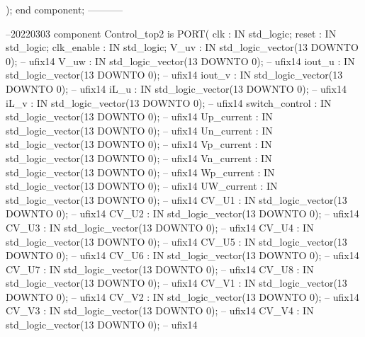 \begin{mylisting}[language=VHDL,caption=トップモジュール,label=appF_Top_module_VHDL]
			);
	end component;
		-----------
		
		
			--20220303
		component Control_top2 is
  PORT( clk                               :   IN    std_logic;
        reset                             :   IN    std_logic;
        clk_enable                        :   IN    std_logic;
        V_uv                              :   IN    std_logic_vector(13 DOWNTO 0);  -- ufix14
        V_uw                              :   IN    std_logic_vector(13 DOWNTO 0);  -- ufix14
        iout_u                            :   IN    std_logic_vector(13 DOWNTO 0);  -- ufix14
        iout_v                            :   IN    std_logic_vector(13 DOWNTO 0);  -- ufix14
        iL_u                              :   IN    std_logic_vector(13 DOWNTO 0);  -- ufix14
        iL_v                              :   IN    std_logic_vector(13 DOWNTO 0);  -- ufix14
        switch_control                    :   IN    std_logic_vector(13 DOWNTO 0);  -- ufix14
        Up_current                        :   IN    std_logic_vector(13 DOWNTO 0);  -- ufix14
        Un_current                        :   IN    std_logic_vector(13 DOWNTO 0);  -- ufix14
        Vp_current                        :   IN    std_logic_vector(13 DOWNTO 0);  -- ufix14
        Vn_current                        :   IN    std_logic_vector(13 DOWNTO 0);  -- ufix14
        Wp_current                        :   IN    std_logic_vector(13 DOWNTO 0);  -- ufix14
        UW_current                        :   IN    std_logic_vector(13 DOWNTO 0);  -- ufix14
        CV_U1                             :   IN    std_logic_vector(13 DOWNTO 0);  -- ufix14
        CV_U2                             :   IN    std_logic_vector(13 DOWNTO 0);  -- ufix14
        CV_U3                             :   IN    std_logic_vector(13 DOWNTO 0);  -- ufix14
        CV_U4                             :   IN    std_logic_vector(13 DOWNTO 0);  -- ufix14
        CV_U5                             :   IN    std_logic_vector(13 DOWNTO 0);  -- ufix14
        CV_U6                             :   IN    std_logic_vector(13 DOWNTO 0);  -- ufix14
        CV_U7                             :   IN    std_logic_vector(13 DOWNTO 0);  -- ufix14
        CV_U8                             :   IN    std_logic_vector(13 DOWNTO 0);  -- ufix14
        CV_V1                             :   IN    std_logic_vector(13 DOWNTO 0);  -- ufix14
        CV_V2                             :   IN    std_logic_vector(13 DOWNTO 0);  -- ufix14
        CV_V3                             :   IN    std_logic_vector(13 DOWNTO 0);  -- ufix14
        CV_V4                             :   IN    std_logic_vector(13 DOWNTO 0);  -- ufix14

\end{mylisting}
